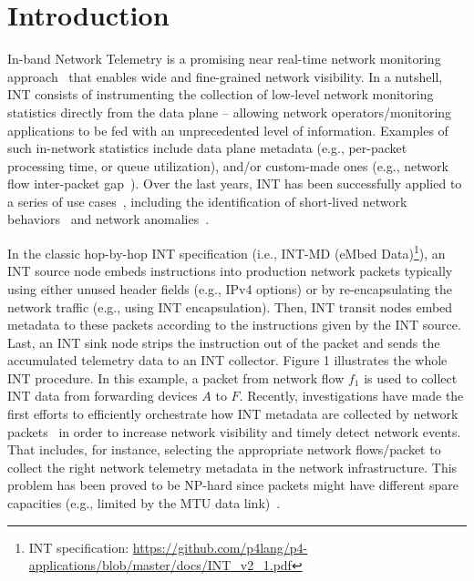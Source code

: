 \section{Introduction}
\label{sec:introduction}

In-band Network Telemetry is a promising near real-time network monitoring approach~\cite{tpp-jeyakumar2014, 8526824, infocom19-pathplanning} that enables wide and fine-grained network visibility. In a nutshell, INT consists of instrumenting the collection of low-level network monitoring statistics directly from the data plane -- allowing network operators/monitoring applications to be fed with an unprecedented level of information. Examples of such in-network statistics include data plane metadata (e.g., per-packet processing time, or queue utilization), and/or custom-made ones (e.g., network flow inter-packet gap~\cite{SIGCOMM-2020-poster}). Over the last years, INT has been successfully applied to a series of use cases~\cite{9687464}, including the identification of short-lived network behaviors~\cite{10.1145/3265723.3265731} and network anomalies~\cite{comml-hohemberger-2019}.

In the classic hop-by-hop INT specification (i.e., INT-MD (eMbed Data)\footnote{INT specification: \url{https://github.com/p4lang/p4-applications/blob/master/docs/INT_v2_1.pdf}}), an INT source node embeds instructions into production network packets typically using either unused header fields (e.g., IPv4 options) or by re-encapsulating the network traffic (e.g., using INT encapsulation). Then, INT transit nodes embed metadata to these packets according to the instructions given by the INT source. Last, an INT sink node strips the instruction out of the packet and sends the accumulated telemetry data to an INT collector. Figure 1 illustrates the whole INT procedure. In this example, a packet from network flow $f_1$ is used to collect INT data from forwarding devices $A$ to $F$. Recently, investigations have made the first efforts to efficiently orchestrate how INT metadata are collected by network packets~\cite{infocom19-pathplanning, IntOpt-8761722, comml-hohemberger-2019, 9330755} in order to increase network visibility and timely detect network events. That includes, for instance, selecting the appropriate network flows/packet to collect the right network telemetry metadata in the network infrastructure. This problem has been proved to be NP-hard since packets might have different spare capacities (e.g., limited by the MTU data link)~\cite{JISA2019-int}. 

